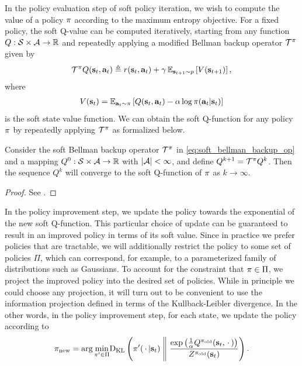 In the policy evaluation step of soft policy iteration, we wish to compute the value of a policy $\pi$ according to the maximum entropy objective. For a fixed policy, the soft Q-value can be computed iteratively, starting from any function $Q: \mathcal{S}\times \mathcal{A} \rightarrow \mathbb{R}$ and repeatedly applying a modified Bellman backup operator $\mathcal{T}^\pi$ given by
\begin{align}
\label{eq:soft_bellman_backup_op}
\mathcal{T}^\pi Q({\mathbf{s}_t}, {\mathbf{a}_t}) \triangleq  r({\mathbf{s}_t}, {\mathbf{a}_t}) + \gamma \operatorname{\mathbb{E}}_{{\mathbf{s}_{t+1}} \sim p}\left[V({\mathbf{s}_{t+1}})\right],
\end{align}
where
\begin{align}
V({\mathbf{s}_t}) = \operatorname{\mathbb{E}}_{{\mathbf{a}_t}\sim\pi}\left[Q({\mathbf{s}_t}, {\mathbf{a}_t}) - \alpha\log\pi({\mathbf{a}_t}|{\mathbf{s}_t})\right]
\label{eq:soft_value_function}
\end{align}
is the soft state value function. We can obtain the soft Q-function for any policy $\pi$ by repeatedly applying $\mathcal{T}^\pi$ as formalized below.
\begin{lemma}
\label{lem:soft_policy_evaluation}
Consider the soft Bellman backup operator $\mathcal{T}^\pi$ in \autoref{eq:soft_bellman_backup_op} and a mapping $Q^0: \mathcal{S} \times \mathcal{A}\rightarrow \mathbb{R}$ with $|\mathcal{A}|<\infty$, and define $Q^{k+1} = \mathcal{T}^\pi Q^k$. Then the sequence $Q^k$ will converge to the soft Q-function of $\pi$ as $k\rightarrow \infty$.
\begin{proof}
See .
\end{proof}
\end{lemma}
In the policy improvement step, we update the policy towards the exponential of the new soft Q-function. This particular choice of update can be guaranteed to result in an improved policy in terms of its soft value. Since in practice we prefer policies that are tractable, we will additionally restrict the policy to some set of policies $\Pi$, which can correspond, for example, to a parameterized family of distributions such as Gaussians.  To account for the constraint that $\pi \in \Pi$, we project the improved policy into the desired set of policies. While in principle we could choose any projection, it will turn out to be convenient to use the information projection defined in terms of the Kullback-Leibler divergence. In the other words, in the policy improvement step, for each state, we update the policy according to
\begin{align}
\pi_\mathrm{new} = \arg\underset{\pi'\in \Pi}{\min}\mathrm{D_{KL}}\left(\pi'({\,\cdot\,}|{\mathbf{s}_t})\;\middle\|\;\frac{\exp\left(\frac{1}{\alpha}Q^{\pi_\mathrm{old}}({\mathbf{s}_t}, {\,\cdot\,})\right)}{Z^{\pi_\mathrm{old}}({\mathbf{s}_t})}\right).
\label{eq:constrainted_policy_fitting}
\end{align}
